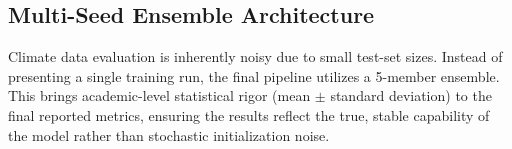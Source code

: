 \subsection{Multi-Seed Ensemble Architecture}
Climate data evaluation is inherently noisy due to small test-set sizes. Instead of presenting a single training run, the final pipeline utilizes a 5-member ensemble. This brings academic-level statistical rigor (mean $\pm$ standard deviation) to the final reported metrics, ensuring the results reflect the true, stable capability of the model rather than stochastic initialization noise.